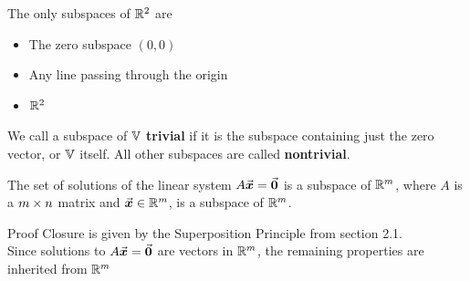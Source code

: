 \documentclass{beamer}
\begin{document}
\begin{frame}
\begin{corollary}
The only subspaces of $\mathbb{R}^2$ are
\begin{itemize}
\item The zero subspace ${(0,0)}$
\item Any line passing through the origin
\item $\mathbb{R}^2$
\end{itemize}
\end{corollary}\pause
\begin{block}{}
We call a subspace of $\mathbb{V}$ \textbf{trivial} if it is the subspace containing just the zero vector, or $\mathbb{V}$ itself. All other subspaces are called \textbf{nontrivial}.
\end{block}\pause

\begin{theorem}
The set of solutions of the linear system $A{\vec{\boldsymbol{x}}}={\vec{\boldsymbol{0}}}$ is a subspace of $\mathbb{R}^m$, where $A$ is a $m \times n$ matrix and ${\vec{\boldsymbol{x}}}\in\mathbb{R}^m$, is a subspace of $\mathbb{R}^m$.
\end{theorem}\pause
\begin{block}{Proof}
Closure is given by the Superposition Principle from section 2.1.\pause\\
Since solutions to $A{\vec{\boldsymbol{x}}}={\vec{\boldsymbol{0}}}$ are vectors in $\mathbb{R}^m$, the remaining properties are inherited from $\mathbb{R}^m$
\end{block}
\end{frame}
\end{document}
